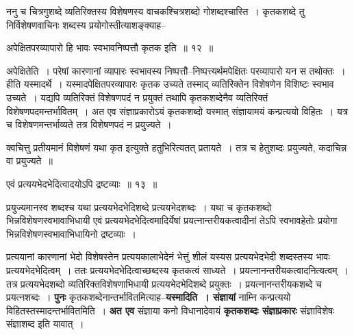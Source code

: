 \documentclass[article,12pt,a4paper]{memoir}
\begin{document}
	ननु च चित्रगुशब्दे व्यतिरिक्तस्य विशेषणस्य वाचकश्चित्रशब्दो गोशब्दश्चास्ति । कृतकशब्दे तु निर्विशेषणवाचिनः शब्दस्य प्रयोगोस्तीत्याशङ्क्याह--  
	  
	अपेक्षितपरव्यापारो हि भावः स्वभावनिष्पत्तौ कृतक इति ॥ १२ ॥ 
	  
	अपेक्षितेति । परेषां कारणानां व्यापारः स्वभावस्य निष्पत्तौ--निष्पत्त्यर्थमपेक्षितः परव्यापारो यन स तथोक्तः । हीति यस्मादर्थे । यस्मादपेक्षितपरव्यापारः कृतक उच्यते तस्माद् व्यतिरिक्तेन विशेषणेन विशिष्टः स्वभाव उच्यते । यद्यपि व्यतिरिक्तं विशेषणपदं न प्रयुक्तं तथापि कृतकशब्देनैव व्यतिरिक्तं विशेषणपदमन्तर्भावितम् । अत एव संज्ञाप्रकारोऽयं कृतकशब्दो यस्मात् संज्ञायामयं कन्प्रत्ययो विहितः । यत्र च विशेषणमन्तर्भाव्यते तत्र विशेषणपदं न प्रयुज्यते ।  
	  
	क्वचित्तु प्रतीयमानं विशेषणं यथा कृत इत्युक्ते हतुभिरित्यतत् प्रतायते । तत्र च हेतुशब्दः प्रयुज्यते, कदाचिन्न वा प्रयुज्यते ॥  
	  
	एवं प्रत्ययभेदभेदित्वादयोऽपि द्रष्टव्याः ॥ १३ ॥ 
	  
	प्रयुज्यमानस्व शब्दश्च यथा प्रत्ययभेदभेदिशब्दे प्रत्ययभेदशब्दः । यथा च कृतकशब्दो भिन्नविशेषणस्वभावाभिधायी एवं प्रत्ययभेदभेदित्वमादिर्येषां प्रयत्नान्तरीयकत्वादीनां तेऽपि स्वभावहेतोः प्रयोगा भिन्नविशेषणस्वभावाभिधायिनो द्रष्टव्याः ।  
	  
	प्रत्ययानां कारणानां भेदो विशेषस्तेन प्रत्ययकालाभेदेनं भेत्तुं शीलं यस्यस प्रत्ययभेदभेदी शब्दस्तस्य भावः प्रत्ययभेदभेदित्वम् । ततः प्रत्ययभेदभेदित्वाच्छब्दस्य कृतकत्वं साध्यते । प्रयत्नानन्तरीयकत्वादनित्यत्वम् । तत्र प्रत्ययभेदशब्दो व्यतिरिक्तविशेषणाभिधायी प्रत्ययभेदभेदिशब्दे प्रयुक्तः । प्रयत्नानन्तरीयकशब्दे च प्रयत्नशब्दः । \textbf{पुनः} कृतकशब्देनान्तर्भावितमित्याह--\textbf{यस्मादिति । संज्ञायां} नाम्नि कन्प्रत्ययो विहितस्तस्मादन्तर्भावितमिति । \textbf{अत एव} संज्ञाया कनो विधानादेवायं \textbf{कृतकशब्दः संज्ञाप्रकारः} संज्ञाविशेषः संज्ञाशब्द इति यावात् ।
	\pend
      
\end{document}
